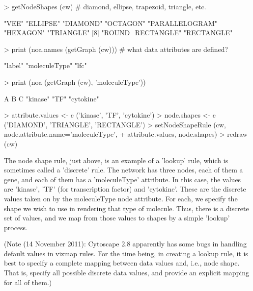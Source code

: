 \documentclass[12pt]{article}
\begin{document}
\begin{Schunk}
\begin{Sinput}
>   getNodeShapes (cw)   # diamond, ellipse, trapezoid, triangle, etc.
\end{Sinput}
\begin{Soutput}
[1] "VEE"             "ELLIPSE"         "DIAMOND"         "OCTAGON"         "PARALLELOGRAM"   "HEXAGON"         "TRIANGLE"       
[8] "ROUND_RECTANGLE" "RECTANGLE"      
\end{Soutput}
\begin{Sinput}
>   print (noa.names (getGraph (cw)))  # what data attributes are defined?
\end{Sinput}
\begin{Soutput}
[1] "label"        "moleculeType" "lfc"         
\end{Soutput}
\begin{Sinput}
>   print (noa (getGraph (cw), 'moleculeType'))
\end{Sinput}
\begin{Soutput}
         A          B          C 
  "kinase"       "TF" "cytokine" 
\end{Soutput}
\begin{Sinput}
>   attribute.values <- c ('kinase',  'TF',       'cytokine')
>   node.shapes      <- c ('DIAMOND', 'TRIANGLE', 'RECTANGLE')
>   setNodeShapeRule (cw, node.attribute.name='moleculeType',
+                     attribute.values, node.shapes)
>   redraw (cw)
\end{Sinput}
\end{Schunk}

The node shape rule, just above, is an example of a 'lookup' rule, which is sometimes called a 'discrete' rule.  The
network has three nodes, each of them a gene, and each of them has a 'moleculeType' attribute.  In this case, the values
are 'kinase', 'TF' (for transcription factor) and 'cytokine'.  These are the discrete values taken on by the
moleculeType node attribute.  For each, we specify the shape we wish to use in rendering that type of molecule.  Thus, there
is a discrete set of values, and we map from those values to shapes by a simple 'lookup' process.

(Note (14 November 2011):  Cytoscape 2.8 apparently has some bugs in handling default values in vizmap rules.  For the time being, in creating a lookup rule, it is best to specify a complete mapping between data values and, i.e., node shape.  That is, specify all possible discrete data values, and provide an explicit mapping for all of them.)
\end{document}
